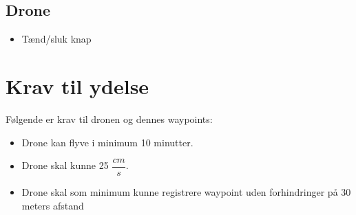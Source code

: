 \documentclass[Main]{subfiles}
\begin{document}
	
	
\subsection{Drone}

	\begin{itemize}
	\item Tænd/sluk knap
	\end{itemize}





\section{Krav til ydelse}
Følgende er krav til dronen og dennes waypoints:

	\begin{itemize}
	\item Drone kan flyve i minimum 10 minutter.
	\item Drone skal kunne 25 $\dfrac{cm}{s}$.
	\item Drone skal som minimum kunne registrere waypoint uden forhindringer på 30 meters afstand
	\end{itemize}



\end{document}
